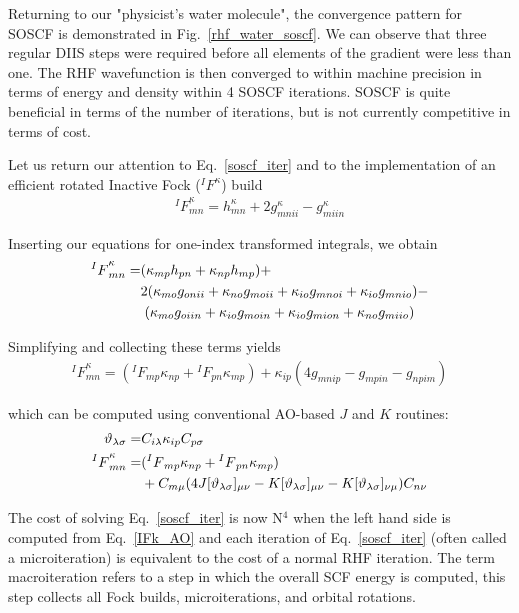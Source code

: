 \documentclass[aip,jcp,preprint,superscriptaddress,floatfix]{revtex4-1}
\begin{document}
Returning to our "physicist's water molecule", the convergence pattern for SOSCF is demonstrated in Fig.~\ref{rhf_water_soscf}.
We can observe that three regular DIIS steps were required before all elements of the gradient were less than one.
The RHF wavefunction is then converged to within machine precision in terms of energy and density within 4 SOSCF iterations.
SOSCF is quite beneficial in terms of the number of iterations, but is not currently competitive in terms of cost.

Let us return our attention to Eq.~\ref{soscf_iter} and to the implementation of an efficient rotated Inactive Fock ($^IF^{\kappa}$) build
\begin{eqnarray}
{^IF}^{\kappa}_{mn} = h^{\kappa}_{mn} + 2g^{\kappa}_{mnii} - g^{\kappa}_{miin}
\end{eqnarray}

Inserting our equations for one-index transformed integrals, we obtain
\begin{align}
{^IF}^{\kappa}_{mn} =& (\kappa_{mp}h_{pn} + \kappa_{np}h_{mp}) + \notag\\
& 2(\kappa_{mo} g_{onii} + \kappa_{no} g_{moii} + \kappa_{io} g_{mnoi} + \kappa_{io} g_{mnio}) -\notag\\
&\;(\kappa_{mo} g_{oiin} + \kappa_{io} g_{moin} + \kappa_{io} g_{mion} + \kappa_{no} g_{miio})
\end{align}

Simplifying and collecting these terms yields
\begin{eqnarray}
{^IF}^{\kappa}_{mn} = ({^IF}_{mp}\kappa_{np} + {^IF}_{pn}\kappa_{mp}) + \kappa_{ip}(4 g_{mnip} - g_{mpin} - g_{npim})
\end{eqnarray}

which can be computed using conventional AO-based $J$ and $K$ routines:
\begin{align}
\vartheta _{\lambda\sigma} =& C_{i\lambda}\kappa_{ip}C_{p\sigma}\\
{^IF}^{\kappa}_{mn} =& ({^IF}_{mp}\kappa_{np} + {^IF}_{pn}\kappa_{mp}) \notag\\&+ C_{m\mu}
(4 J[\vartheta_{\lambda\sigma}]_{\mu\nu} - K[\vartheta_{\lambda\sigma}]_{\mu\nu} - K[\vartheta_{\lambda\sigma}]_{\nu\mu})C_{n\nu}
\label{IFk_AO}
\end{align}

The cost of solving Eq.~\ref{soscf_iter} is now N$^4$ when the left hand side is computed from Eq.~\ref{IFk_AO} and each iteration of Eq.~\ref{soscf_iter} (often called a microiteration) is equivalent to the cost of a normal RHF iteration.
The term macroiteration refers to a step in which the overall SCF energy is computed, this step collects all Fock builds, microiterations, and orbital rotations.
\end{document}
